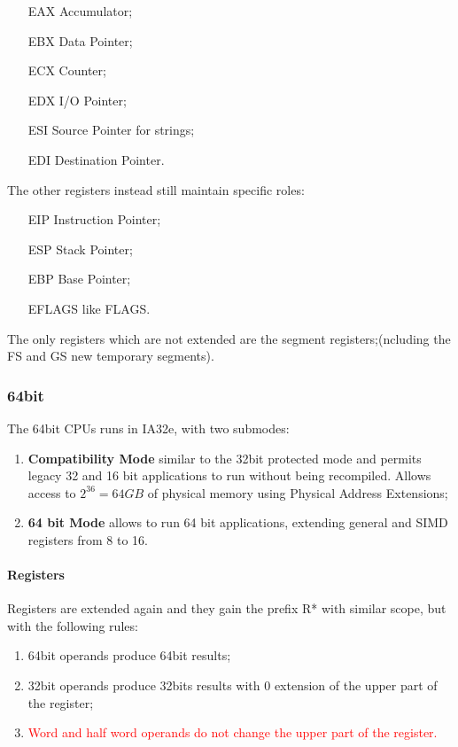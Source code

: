 \begin{itemize}
    \item[EAX] Accumulator; 
    \item[EBX] Data Pointer; \item[ECX] Counter; \item[EDX] I/O Pointer; \item[ESI] Source Pointer for strings;
    \item[EDI] Destination Pointer.
\end{itemize}
The other registers instead still maintain specific roles:
\begin{itemize}
    \item[EIP] Instruction Pointer;
    \item[ESP] Stack Pointer;
    \item[EBP] Base Pointer;
    \item[EFLAGS] like FLAGS.
\end{itemize}
The only registers which are not extended are the segment registers;(ncluding the FS and GS new temporary segments).
\subsubsection{64bit} The 64bit CPUs runs in IA32e, with two submodes:
\begin{enumerate}
    \item \textbf{Compatibility Mode} similar to the 32bit protected mode and permits legacy 32 and 16 bit applications
            to run without being recompiled.  Allows access to $2^{36} = 64GB$ of physical memory using Physical Address Extensions;
    \item \textbf{64 bit Mode} allows to run 64 bit applications, extending general and SIMD registers from 8 to 16.
\end{enumerate}
\paragraph{Registers}
Registers are extended again and they gain the prefix R* with similar scope, but with the following rules: \begin{enumerate}
    \item 64bit operands produce 64bit results;
    \item 32bit operands produce 32bits results with 0 extension of the upper part of the register;
    \item \textcolor{red}{Word and half word operands do not change the upper part of the register.}
\end{enumerate}
